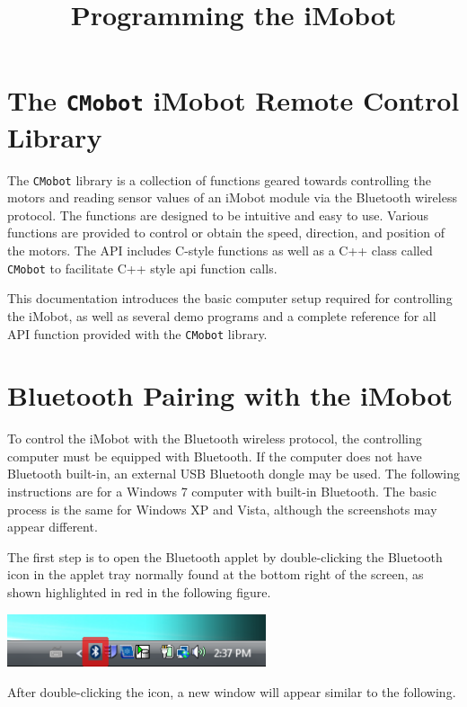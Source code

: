 \documentclass{article}
\title{Programming the iMobot}
\begin{document}
\maketitle

\section{The \texttt{CMobot} iMobot Remote Control Library}
The \texttt{CMobot} library is a collection of functions geared towards
controlling the motors and reading sensor values of an iMobot module via the
Bluetooth wireless protocol. The functions are designed to be intuitive
and easy to use. Various functions are provided to control or obtain the speed,
direction, and position of the motors. The API includes C-style functions as well
as a C++ class called \texttt{CMobot} to facilitate C++ style api function
calls. 

This documentation introduces the basic computer setup required for controlling 
the iMobot, as well as several demo programs and a complete reference for all
API function provided with the \texttt{CMobot} library.

\section{\label{sec:pairing}Bluetooth Pairing with the iMobot}
To control the iMobot with the Bluetooth wireless protocol, the controlling 
computer must be equipped with Bluetooth. If the computer does not have
Bluetooth built-in, an external USB Bluetooth dongle may be used. The following
instructions are for a Windows 7 computer with built-in Bluetooth. The basic
process is the same for Windows XP and Vista, although the screenshots may
appear different. 

The first step is to open the Bluetooth applet by double-clicking the Bluetooth
icon in the applet tray normally found at the bottom right of the screen, as
shown highlighted in red in the following figure.

\begin{center}
\includegraphics[width=3in]{images/imobot_connect_1.png}
\end{center}

After double-clicking the icon, a new window will appear similar to the following.
\end{document}
